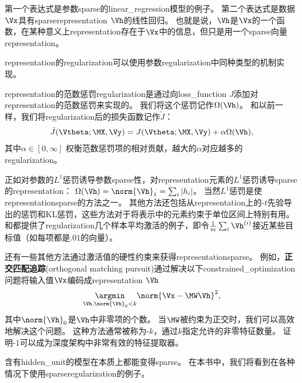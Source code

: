
第一个表达式是参数\gls{sparse}的\gls{linear_regression}模型的例子。
第二个表达式是数据$\Vx$具有\gls{sparse}\gls{representation} $\Vh$的线性回归。
也就是说，$\Vh$是$\Vx$的一个函数，在某种意义上\gls{representation}存在于$\Vx$中的信息，但只是用一个\gls{sparse}向量\gls{representation}。

\gls{representation}的\gls{regularization}可以使用参数\gls{regularization}中同种类型的机制实现。

\gls{representation}的范数惩罚\gls{regularization}是通过向\gls{loss_function} $J$添加对\gls{representation}的范数惩罚来实现的。
我们将这个惩罚记作$\Omega(\Vh)$。
和以前一样，我们将\gls{regularization}后的损失函数记作$\tilde J$：
\begin{align}
 \tilde J(\Vtheta; \MX, \Vy) =  J(\Vtheta; \MX, \Vy)  + \alpha \Omega(\Vh),
\end{align}
其中$\alpha \in [0, \infty]$ 权衡范数惩罚项的相对贡献，越大的$\alpha$对应越多的\gls{regularization}。

正如对参数的$L^1$惩罚诱导参数\gls{sparse}性，对\gls{representation}元素的$L^1$惩罚诱导\gls{sparse}的\gls{representation}：
$\Omega(\Vh) = \norm{\Vh}_1 = \sum_i |h_i|$。
当然$L^1$惩罚是使\gls{representation}\gls{sparse}的方法之一。
其他方法还包括从\gls{representation}上的-$t$先验导出的惩罚\citep{Olshausen+Field-1996,Bergstra-Phd-2011}和\gls{KL}惩罚\citep{Larochelle+Bengio-2008}，这些方法对于将表示中的元素约束于单位区间上特别有用。
\cite{HonglakL2008-small}和\cite{Goodfellow2009}都提供了\gls{regularization}几个样本平均激活的例子，即令$\frac{1}{m}\sum_i \Vh^{(i)}$接近某些目标值（如每项都是$.01$的向量）。

还有一些其他方法通过激活值的硬性约束来获得\gls{representation}\gls{sparse}。
例如，\textbf{正交匹配追踪}(orthogonal matching pursuit)\citep{pati93orthogonal}通过解决以下\gls{constrained_optimization}问题将输入值$\Vx$编码成\gls{representation} $\Vh$
\begin{align}
 \underset{\Vh, \norm{\Vh}_0 < k}{\argmin} \norm{\Vx - \MW \Vh}^2,
\end{align}
其中$\norm{\Vh}_0 $是$\Vh$中非零项的个数。
当$\MW$被约束为正交时，我们可以高效地解决这个问题。
这种方法通常被称为-$k$，通过$k$指定允许的非零特征数量。
\cite{Coates2011b}证明-$1$可以成为深度架构中非常有效的特征提取器。


含有\gls{hidden_unit}的模型在本质上都能变得\gls{sparse}。
在本书中，我们将看到在各种情况下使用\gls{sparse}\gls{regularization}的例子。

